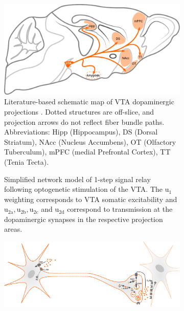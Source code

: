 \begin{sansmath}
\begin{figure}[h!]
	\centering
	\hspace*{\fill}
	\begin{subfigure}{.527\textwidth}
		\centering
		\includegraphics[width=\textwidth]{img/model_literature}
		\caption{
			Literature-based schematic map of VTA dopaminergic projections \cite{Aransay2015,Fields2007,Ikemoto2007,Hnasko2012,Pan2010}.
			Dotted structures are off-slice, and projection arrows do not reflect fiber bundle paths.
			Abbreviations: Hipp (Hippocampus), DS (Dorsal Striatum), NAcc (Nucleus Accumbens), OT (Olfactory Tuberculum), mPFC (medial Prefrontal Cortex), TT (Tenia Tecta).
			}
		\label{fig:ml}
	\end{subfigure}\hfill
	\begin{subfigure}{.44\textwidth}
		\centering
		\vspace{-1em}
		\vspace{-0.6em}
		\caption{
			Simplified network model of 1-step signal relay following optogenetic stimulation of the VTA.
			The $\mathrm{u_1}$ weighting corresponds to VTA somatic excitability and $\mathrm{u_{2a},u_{2b},u_{2c}}$ and $\mathrm{u_{2d}}$ correspond to transmission at the dopaminergic synapses in the respective projection areas.
			}
		\label{fig:nm}
	\end{subfigure}
	\hspace*{\fill}
	\begin{subfigure}{.985\textwidth}
		\centering
		\includegraphics[width=\textwidth]{img/da}

\end{subfigure}
\end{figure}
\end{sansmath}
